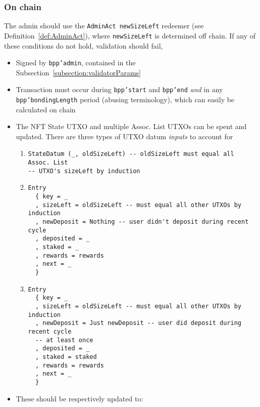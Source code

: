 \documentclass[10pt, a4paper]{article}
\theoremstyle{definition}
\begin{document}
\subsubsection{On chain}
The admin should use the \texttt{AdminAct newSizeLeft} redeemer (see Definition~\ref{def:AdminAct}), where \texttt{newSizeLeft} is determined off chain. If any of these conditions do not hold, validation should fail,
\begin{itemize}
\item{Signed by \texttt{bpp'admin}, contained in the Subsection~\ref{subsection:validatorParams}}
\item{Transaction must occur during \texttt{bpp'start} and \texttt{bpp'end} \textit{and} in any \texttt{bpp'bondingLength} period (abusing terminology), which can easily be calculated on chain}
\item{The NFT State UTXO and multiple Assoc. List UTXOs can be spent and updated. There are three types of UTXO datum \textit{inputs} to account for
\begin{enumerate}
\item{\begin{verbatim}
StateDatum (_, oldSizeLeft) -- oldSizeLeft must equal all Assoc. List
-- UTXO's sizeLeft by induction
\end{verbatim}
}
\item{
\begin{verbatim}
Entry
  { key = _
  , sizeLeft = oldSizeLeft -- must equal all other UTXOs by induction
  , newDeposit = Nothing -- user didn't deposit during recent cycle
  , deposited = _
  , staked = _
  , rewards = rewards
  , next = _
  }  
\end{verbatim}
}
\item{
\begin{verbatim}
Entry
  { key = _
  , sizeLeft = oldSizeLeft -- must equal all other UTXOs by induction
  , newDeposit = Just newDeposit -- user did deposit during recent cycle
  -- at least once
  , deposited = _
  , staked = staked
  , rewards = rewards
  , next = _
  }  
\end{verbatim}
}
\end{enumerate}

}

\item{These should be respectively updated to:

}
\end{itemize}
\end{document}
